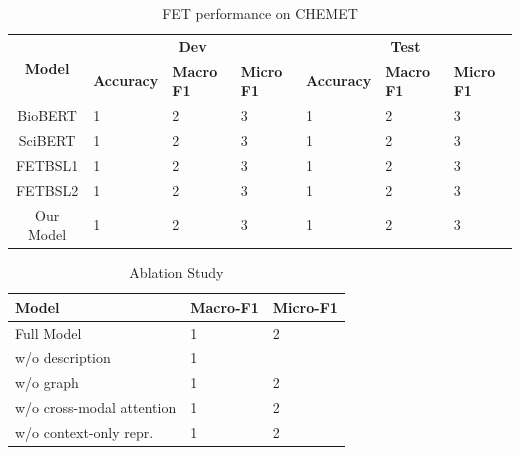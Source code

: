 \begin{table}[t]
	\caption{FET performance on CHEMET}
	\centering
	\label{table:result}
			\begin{tabular}{cllllll}
				\toprule
				\multirow{2}{*}{\textbf{Model}} 
				& \multicolumn{3}{c}{\textbf{Dev}} 
				& \multicolumn{3}{c}{\textbf{Test}} \\             
				& \textbf{Accuracy} & \textbf{Macro F1} & \textbf{Micro F1} & \textbf{Accuracy}&  \textbf{Macro F1} & \textbf{Micro F1} \\  
				\midrule
				BioBERT & 1 & 2 & 3 & 1 & 2 & 3 \\      
				SciBERT & 1 & 2 & 3 & 1 & 2 & 3 \\ 
				FETBSL1& 1 & 2 & 3 & 1 & 2 & 3 \\ 
				FETBSL2 & 1 & 2 & 3 & 1 & 2 & 3 \\ 
				Our Model & 1 & 2 & 3 & 1 & 2 & 3 \\ 
				\bottomrule    
			\end{tabular}
		
\end{table}
\begin{table}[t]
	\begin{small}
	\caption{Ablation Study}
	\centering
	\label{table:ablation}
			\begin{tabular}{lll}
				\toprule
				\textbf{Model}
				& \textbf{Macro-F1} & \textbf{Micro-F1}  \\  
				\midrule
				
				Full Model& 1 &2 \\\hline 
				w/o description& 1 &  \\      
				w/o graph& 1 &2  \\    
				w/o cross-modal attention& 1 &2  \\       
				w/o context-only repr.& 1 &2  \\   
				\bottomrule    
			\end{tabular}
		
	\end{small}
\end{table}

		
